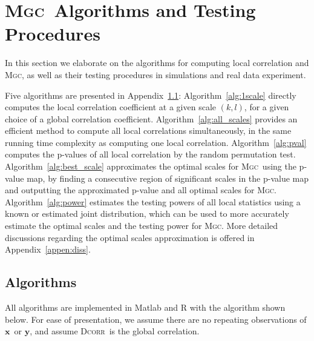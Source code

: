 \documentclass[11pt]{article}
\providecommand{\sct}[1]{{\normalfont\textsc{#1}}}
\providecommand{\mb}[1]{\boldsymbol{#1}}
\newcommand{\Mgc}{\sct{Mgc}}
\newcommand{\Dcorr}{\sct{Dcorr}}
\newcommand{\mbx}{\ensuremath{\mb{x}}}
\newcommand{\mby}{\ensuremath{\mb{y}}}
\begin{document}

\section{\Mgc~Algorithms and Testing Procedures}
\label{appen:tests}
In this section we elaborate on the algorithms for computing local correlation and \Mgc, as well as their testing procedures in simulations and real data experiment.

Five algorithms are presented in Appendix~\ref{appen:algorithms}: Algorithm~\ref{alg:1scale} directly computes the local correlation coefficient at a given scale $(k,l)$, for a given choice of a global correlation coefficient.
Algorithm~\ref{alg:all_scales} provides an efficient method to compute all local correlations simultaneously, in the same running time complexity as computing one local correlation. Algorithm~\ref{alg:pval} computes the p-values of all local correlation by the random permutation test. 
Algorithm~\ref{alg:best_scale} approximates the optimal scales for \Mgc~using the p-value map, by finding a consecutive region of significant scales in the p-value map and 
outputting the approximated p-value and all optimal scales for \Mgc. 
Algorithm~\ref{alg:power} estimates the testing powers of all local statistics using a known or estimated joint distribution, which can be used to more accurately estimate the optimal scales and the testing power for \Mgc. More detailed discussions regarding the optimal scales approximation is offered in Appendix~\ref{appen:diss}.

\subsection{Algorithms}
\label{appen:algorithms}
All algorithms are implemented in Matlab and R with the algorithm shown below. For ease of presentation, we assume there are no repeating observations of \mbx~or \mby, and assume \Dcorr~is the global correlation.
\end{document}
